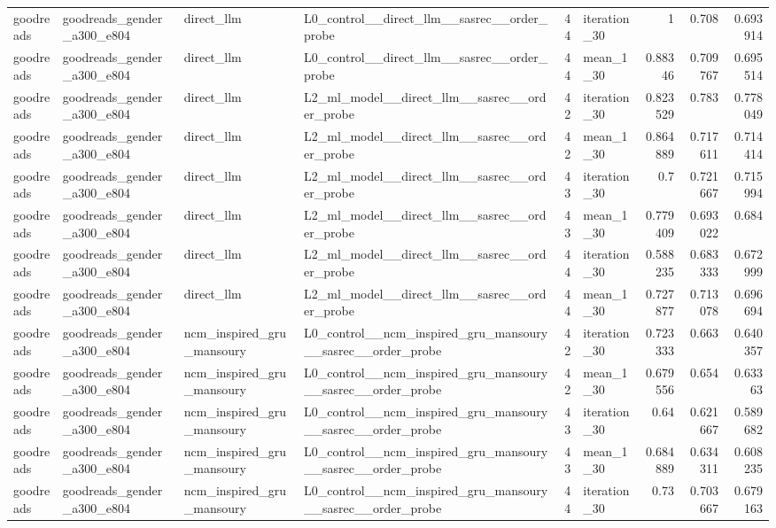 \begin{table}[htbp!]
\begin{tabular}{llllrlrrr}
goodreads & goodreads\_gender\_a300\_e804 & direct\_llm & L0\_control\_\_direct\_llm\_\_sasrec\_\_order\_probe & 44 & iteration\_30 & 1 & 0.708 & 0.693914 \\
goodreads & goodreads\_gender\_a300\_e804 & direct\_llm & L0\_control\_\_direct\_llm\_\_sasrec\_\_order\_probe & 44 & mean\_1\_30 & 0.88346 & 0.709767 & 0.695514 \\
goodreads & goodreads\_gender\_a300\_e804 & direct\_llm & L2\_ml\_model\_\_direct\_llm\_\_sasrec\_\_order\_probe & 42 & iteration\_30 & 0.823529 & 0.783 & 0.778049 \\
goodreads & goodreads\_gender\_a300\_e804 & direct\_llm & L2\_ml\_model\_\_direct\_llm\_\_sasrec\_\_order\_probe & 42 & mean\_1\_30 & 0.864889 & 0.717611 & 0.714414 \\
goodreads & goodreads\_gender\_a300\_e804 & direct\_llm & L2\_ml\_model\_\_direct\_llm\_\_sasrec\_\_order\_probe & 43 & iteration\_30 & 0.7 & 0.721667 & 0.715994 \\
goodreads & goodreads\_gender\_a300\_e804 & direct\_llm & L2\_ml\_model\_\_direct\_llm\_\_sasrec\_\_order\_probe & 43 & mean\_1\_30 & 0.779409 & 0.693022 & 0.684 \\
goodreads & goodreads\_gender\_a300\_e804 & direct\_llm & L2\_ml\_model\_\_direct\_llm\_\_sasrec\_\_order\_probe & 44 & iteration\_30 & 0.588235 & 0.683333 & 0.672999 \\
goodreads & goodreads\_gender\_a300\_e804 & direct\_llm & L2\_ml\_model\_\_direct\_llm\_\_sasrec\_\_order\_probe & 44 & mean\_1\_30 & 0.727877 & 0.713078 & 0.696694 \\
goodreads & goodreads\_gender\_a300\_e804 & ncm\_inspired\_gru\_mansoury & L0\_control\_\_ncm\_inspired\_gru\_mansoury\_\_sasrec\_\_order\_probe & 42 & iteration\_30 & 0.723333 & 0.663 & 0.640357 \\
goodreads & goodreads\_gender\_a300\_e804 & ncm\_inspired\_gru\_mansoury & L0\_control\_\_ncm\_inspired\_gru\_mansoury\_\_sasrec\_\_order\_probe & 42 & mean\_1\_30 & 0.679556 & 0.654 & 0.63363 \\
goodreads & goodreads\_gender\_a300\_e804 & ncm\_inspired\_gru\_mansoury & L0\_control\_\_ncm\_inspired\_gru\_mansoury\_\_sasrec\_\_order\_probe & 43 & iteration\_30 & 0.64 & 0.621667 & 0.589682 \\
goodreads & goodreads\_gender\_a300\_e804 & ncm\_inspired\_gru\_mansoury & L0\_control\_\_ncm\_inspired\_gru\_mansoury\_\_sasrec\_\_order\_probe & 43 & mean\_1\_30 & 0.684889 & 0.634311 & 0.608235 \\
goodreads & goodreads\_gender\_a300\_e804 & ncm\_inspired\_gru\_mansoury & L0\_control\_\_ncm\_inspired\_gru\_mansoury\_\_sasrec\_\_order\_probe & 44 & iteration\_30 & 0.73 & 0.703667 & 0.679163 \\

\end{tabular}
\end{table}
